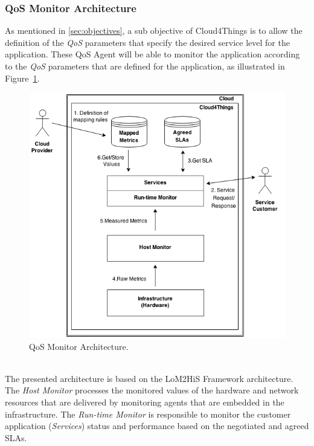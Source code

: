 \subsubsection{QoS Monitor Architecture}
\label{subs:monitoring_srchitecture}
As mentioned in \ref{sec:objectives}, a sub objective of Cloud4Things is to allow the
definition of the \textit{QoS} parameters that specify the desired service level for
the application. These QoS Agent will be able to monitor the application according to
the \textit{QoS} parameters that are defined for the application, as illustrated in
Figure~\ref{fig:monitor_architecture}.
\begin{figure}[h!]
  \centering
  \includegraphics[width=.8\textwidth]{./images/monitor-architecture}
  \caption{QoS Monitor Architecture.}
  \label{fig:monitor_architecture}
\end{figure}\\
The presented architecture is based on the LoM2HiS Framework \cite{emeakaroha2010low} architecture. The
\textit{Host Monitor} processes the monitored values of the hardware and network resources that are delivered
by monitoring agents that are embedded in the infrastructure. The \textit{Run-time Monitor} is responsible to
monitor the customer application (\textit{Services}) status and performance based on the negotiated
and agreed SLAs.\\

